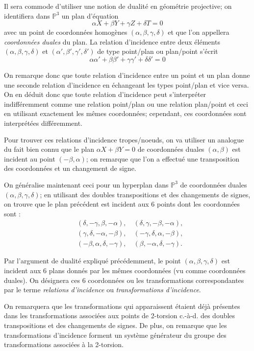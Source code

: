 \documentclass[a4paper,12pt]{article}
\theoremstyle{definition}
\theoremstyle{remark}
\numberwithin{equation}{section}
\begin{document}
Il sera commode d'utiliser une notion de dualité en géométrie projective; on identifiera dans $\mathbb{P}^3$ un plan d'équation $$\alpha X + \beta Y + \gamma Z + \delta T = 0$$ avec un point de coordonnées homogènes $(\alpha, \beta, \gamma, \delta)$ et que l'on appellera \emph{coordonnées duales} du plan. La relation d'incidence entre deux éléments $(\alpha, \beta, \gamma, \delta)$ et $(\alpha', \beta', \gamma', \delta')$ de type point/plan ou plan/point s'écrit
$$\alpha\alpha' + \beta\beta' + \gamma\gamma' + \delta\delta' = 0$$

On remarque donc que toute relation d'incidence entre un point et un plan donne une seconde relation d'incidence en échangeant les types point/plan et vice versa. On en déduit donc que toute relation d'incidence peut s'interpréter indifféremment comme une relation point/plan ou une relation plan/point et ceci en utilisant exactement les mêmes coordonnées; cependant, ces coordonnées sont interprétées différemment.

Pour trouver ces relations d'incidence tropes/noeuds, on va utiliser un analogue du fait bien connu que le plan $\alpha X + \beta Y=0$ de coordonnées duales $(\alpha,\beta)$ est incident au point $(-\beta, \alpha)$; on remarque que l'on a effectué une transposition des coordonnées et un changement de signe.

On généralise maintenant ceci pour un hyperplan dans $\mathbb{P}^3$ de coordonnées duales $(\alpha, \beta, \gamma, \delta)$; en utilisant des doubles transpositions et des changements de signes, on trouve que le plan précédent est incident aux 6 points dont les coordonnées sont :
\begin{align*}
   &(\delta, -\gamma, \beta, -\alpha), \quad (\delta, \gamma, -\beta, -\alpha), \\
   &(\gamma, \delta, -\alpha, -\beta), \quad (-\gamma, \delta, \alpha, -\beta), \\
   &(-\beta, \alpha, \delta, -\gamma), \quad (\beta, -\alpha, \delta, -\gamma).
\end{align*}

Par l'argument de dualité expliqué précédemment, le point $(\alpha, \beta, \gamma, \delta)$ est incident aux 6 plans donnés par les mêmes coordonnées (vu comme coordonnées duales).
On désignera ces 6 coordonnées ou les transformations correspondantes par le terme \emph{relations d'incidence} ou \emph{transformations d'incidence}.

On remarquera que les transformations qui apparaissent étaient déjà présentes dans les transformations associées aux points de 2-torsion c.-à-d. des doubles transpositions et des changements de signes. De plus, on remarque que les transformations d'incidence forment un système générateur du groupe des transformations associées à la 2-torsion.
\end{document}
